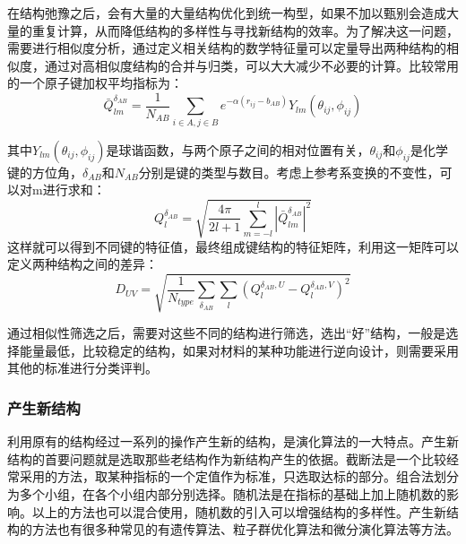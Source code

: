 在结构弛豫之后，会有大量的大量结构优化到统一构型，如果不加以甄别会造成大量的重复计算，从而降低结构的多样性与寻找新结构的效率。为了解决这一问题，需要进行相似度分析，通过定义相关结构的数学特征量可以定量导出两种结构的相似度，通过对高相似度结构的合并与归类，可以大大减少不必要的计算。比较常用的一个原子键加权平均指标为：
\begin{equation}
    \bar{Q}_{lm}^{\delta_{AB}}=\frac{1}{N_{AB}}\sum_{i \in A,j \in B}e^{-\alpha(r_{ij}-b_{AB})}Y_{lm}(\theta_{ij},\phi_{ij} )
    \label{eq:jjq}
\end{equation}

其中$Y_{lm}(\theta_{ij},\phi_{ij} )$是球谐函数，与两个原子之间的相对位置有关，$\theta_{ij}\text{和}\phi_{ij}$是化学键的方位角，$\delta_{AB}\text{和}N_{AB}$分别是键的类型与数目。考虑上参考系变换的不变性，可以对m进行求和：
\begin{equation}
    Q_{l}^{\delta_{AB}}=\sqrt{\frac{4\pi}{2l+1}\sum_{m=-l}^{l}|\bar{Q}_{lm}^{\delta_{AB}}|^{2}}
    \label{eq:jjq2}
\end{equation}
这样就可以得到不同键的特征值，最终组成键结构的特征矩阵，利用这一矩阵可以定义两种结构之间的差异：
\begin{equation}
    D_{UV}=\sqrt{\frac{1}{N_{type}}\sum_{\delta_{AB}}\sum_{l}(Q_{l}^{\delta_{AB},U}-Q_{l}^{\delta_{AB},V})^{2}}
    \label{eq:jjq3}
\end{equation}

通过相似性筛选之后，需要对这些不同的结构进行筛选，选出“好”结构，一般是选择能量最低，比较稳定的结构，如果对材料的某种功能进行逆向设计，则需要采用其他的标准进行分类评判。

\subsubsection{产生新结构}

利用原有的结构经过一系列的操作产生新的结构，是演化算法的一大特点。产生新结构的首要问题就是选取那些老结构作为新结构产生的依据。截断法是一个比较经常采用的方法，取某种指标的一个定值作为标准，只选取达标的部分。组合法划分为多个小组，在各个小组内部分别选择。随机法是在指标的基础上加上随机数的影响。以上的方法也可以混合使用，随机数的引入可以增强结构的多样性。产生新结构的方法也有很多种常见的有遗传算法、粒子群优化算法和微分演化算法等方法。

